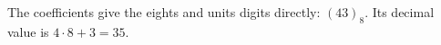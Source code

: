 The coefficients give the eights and units digits directly: $\boxed{(43)_8}$. Its decimal value is $4\cdot8+3=35$.

